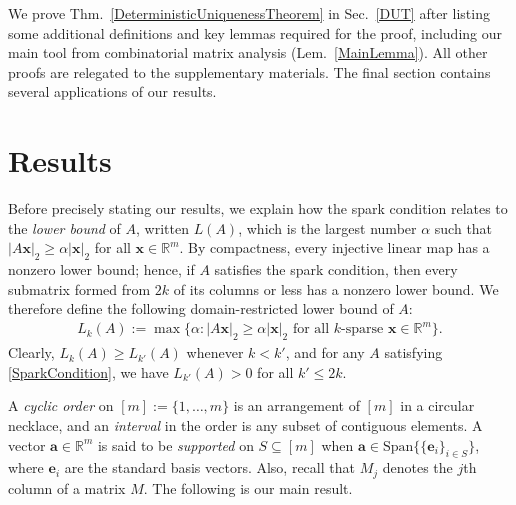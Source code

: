 \documentclass[journal, twocolumn]{IEEEtran}
\begin{document}
We prove Thm.~\ref{DeterministicUniquenessTheorem} in Sec.~\ref{DUT} after listing some additional definitions and key lemmas required for the proof, including our main tool from combinatorial matrix analysis (Lem.~\ref{MainLemma}). All other proofs are relegated to the supplementary materials. The final section contains several applications of our results.


\section{Results}\label{Results}

Before precisely stating our results, we explain how the spark condition relates to the \emph{lower bound} \cite{Grcar10} of $A$, written $L(A)$, which is the largest number $\alpha$ such that $|A\mathbf{x}|_2 \geq \alpha|\mathbf{x}|_2$ for all $\mathbf{x} \in \mathbb{R}^m$. By compactness, every injective linear map has a nonzero lower bound; hence, if $A$ satisfies the spark condition, then every submatrix formed from $2k$ of its columns or less has a nonzero lower bound. We therefore define the following domain-restricted lower bound of $A$:
\begin{align*}
L_k(A) := \max \{ \alpha : |A\mathbf{x}|_2 \geq \alpha|\mathbf{x}|_2 \text{ for all $k$-sparse } \mathbf{x} \in \mathbb{R}^m\}.
\end{align*} 
Clearly, $L_k(A) \geq L_{k'}(A)$ whenever $k < k'$, and for any $A$ satisfying \eqref{SparkCondition}, we have $L_{k'}(A) > 0$ for all $k' \leq 2k$. 

A \textit{cyclic order} on $[m] := \{1, \ldots,m\}$ is an arrangement of $[m]$ in a circular necklace, and an \textit{interval} in the order is any subset of contiguous elements. A vector $\mathbf{a} \in \mathbb{R}^m$ is said to be \emph{supported} on $S \subseteq [m]$ when $\mathbf{a} \in \text{Span}\{ \{\mathbf{e}_i\}_{i\in S}\}$, where $\mathbf{e}_i$ are the standard basis vectors.  Also, recall that $M_j$ denotes the $j$th column of a matrix $M$. The following is our main result.
\end{document}
